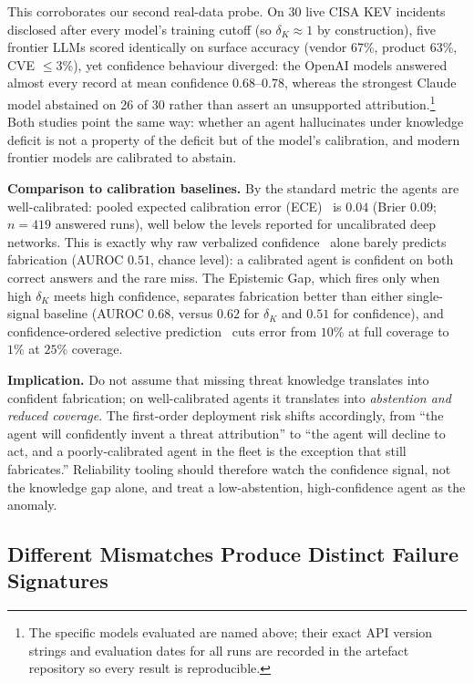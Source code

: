 This corroborates our second real-data probe. On 30 live CISA KEV
incidents disclosed after every model's training cutoff (so $\delta_K
\approx 1$ by construction), five frontier LLMs scored identically on
surface accuracy (vendor 67\%, product 63\%, CVE $\leq$3\%), yet
confidence behaviour diverged: the OpenAI models answered almost
every record at mean confidence 0.68--0.78, whereas the strongest
Claude model abstained on 26 of 30 rather than assert an unsupported
attribution.\footnote{The specific models evaluated are named above; their
exact API version strings and evaluation dates for all runs are recorded in
the artefact repository so every result is reproducible.} Both
studies point the same way: whether an agent hallucinates under
knowledge deficit is not a property of the deficit but of the model's
calibration, and modern frontier models are calibrated to abstain.

\textbf{Comparison to calibration baselines.} By the standard metric the
agents are well-calibrated: pooled expected calibration error
(ECE)~\cite{guo2017calibration} is $0.04$ (Brier $0.09$; $n=419$ answered
runs), well below the levels reported for uncalibrated deep networks. This
is exactly why raw verbalized confidence~\cite{tian2023calibration} alone
barely predicts fabrication (AUROC
$0.51$, chance level): a calibrated agent is confident on both correct
answers and the rare miss. The Epistemic Gap, which fires only when high
$\delta_K$ meets high confidence, separates fabrication better than either
single-signal baseline (AUROC $0.68$, versus $0.62$ for $\delta_K$ and
$0.51$ for confidence), and confidence-ordered selective
prediction~\cite{elyaniv2010selective} cuts
error from $10\%$ at full coverage to $1\%$ at $25\%$ coverage.

\textbf{Implication.} Do not assume that missing threat knowledge
translates into confident fabrication; on well-calibrated agents it
translates into \textit{abstention and reduced coverage}. The
first-order deployment risk shifts accordingly, from ``the agent will
confidently invent a threat attribution'' to ``the agent will decline
to act, and a poorly-calibrated agent in the fleet is the exception
that still fabricates.'' Reliability tooling should therefore watch the
confidence signal, not the knowledge gap alone, and treat a
low-abstention, high-confidence agent as the anomaly.

\subsection{Different Mismatches Produce Distinct Failure Signatures}

